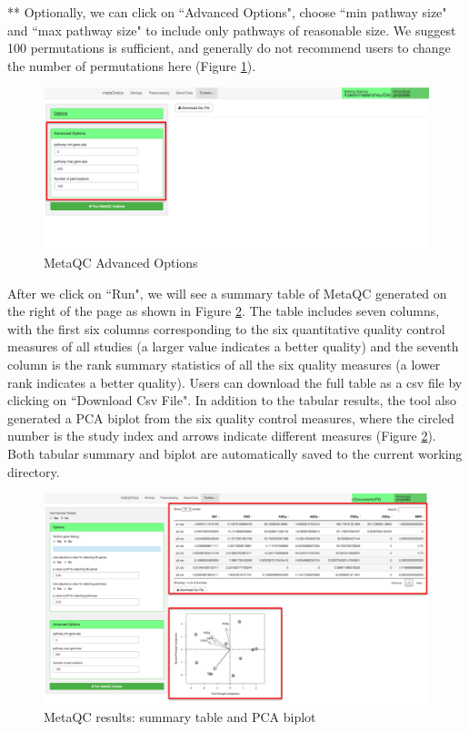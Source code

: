 ** Optionally, we can click on ``Advanced Options", choose ``min pathway size" and ``max pathway size" to include only pathways of reasonable size. We suggest 100 permutations is sufficient, and generally do not recommend users to change the number of permutations here (Figure \ref{fig:option2}). 

\begin{figure}[H]
\begin{center}
\includegraphics[scale=0.5]{./figure/metaQC/option2}
\caption{MetaQC Advanced Options}
\label{fig:option2}
\end{center}
\end{figure}

After we click on ``Run", we will see a summary table of MetaQC generated on the right of the page as shown in Figure \ref{fig:result}. The table includes seven columns, with the first six columns corresponding to the six quantitative quality control measures of all studies (a larger value indicates a better quality) and the seventh column is the rank summary statistics of all the six quality measures (a lower rank indicates a better quality). Users can download the full table as a csv file by clicking on ``Download Csv File". In addition to the tabular results, the tool also generated a PCA biplot from the six quality control measures, where the circled number is the study index and arrows indicate different measures (Figure \ref{fig:result}). Both tabular summary and biplot are automatically saved to the current working directory. 

\begin{figure}[H]
\begin{center}
\includegraphics[scale=0.5]{./figure/metaQC/result}
\caption{MetaQC results: summary table and PCA biplot}
\label{fig:result}
\end{center}
\end{figure}


